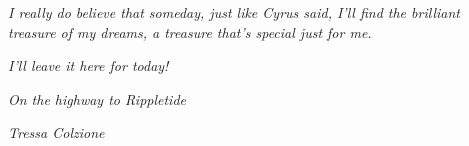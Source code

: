 \emph{I really do believe that someday, just like Cyrus said, I'll find the brilliant treasure of my dreams, a treasure that's special just for me.}

\emph{I'll leave it here for today!}

\begin{flushright}
\emph{On the highway to Rippletide}

\emph{Tressa Colzione}
\end{flushright}